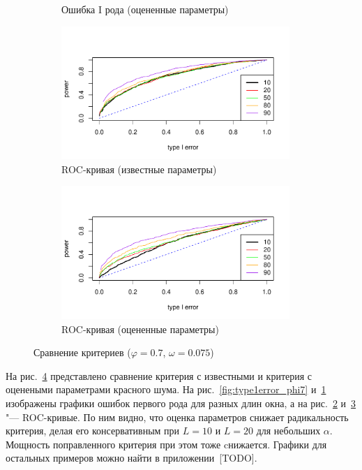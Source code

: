 \documentclass[specialist,
substylefile = spbu_report.rtx,
subf,href,colorlinks=true, 12pt]{disser}
\theoremstyle{definition}
\begin{document}
\begin{figure}[h!]
\begin{subfigure}[t]{0.5\textwidth}
		\caption{Ошибка I рода (оцененные параметры)}
		\label{fig:type1error_phi7est}
	\end{subfigure}
	\bigskip
	\begin{subfigure}[t]{0.5\textwidth}
		\centering
		\includegraphics[width=0.95\textwidth]{img/roc_phi7_omega0075.pdf}
		\caption{ROC-кривая (известные параметры)}
		\label{fig:roc_phi7_omega0075}
	\end{subfigure}\hspace{\fill}
	\begin{subfigure}[t]{0.5\textwidth}
		\centering
		\includegraphics[width=0.95\textwidth]{img/roc_phi7est_omega0075.pdf}
		\caption{ROC-кривая (оцененные параметры)}
		\label{fig:roc_phi7est_omega0075}
	\end{subfigure}
	\caption{Сравнение критериев ($\varphi=0.7$, $\omega=0.075$)}
	\label{fig:est_comp}
\end{figure}

На рис.~\ref{fig:est_comp} представлено сравнение критерия с известными и критерия с оценеными параметрами красного шума. На рис.~\ref{fig:type1error_phi7} и~\ref{fig:type1error_phi7est} изображены графики ошибок первого рода для разных длин окна, а на рис.~\ref{fig:roc_phi7_omega0075} и~\ref{fig:roc_phi7est_omega0075} "--- ROC-кривые. По ним видно, что оценка параметров снижает радикальность критерия, делая его консервативным при $L=10$ и $L=20$ для небольших $\alpha$. Мощность поправленного критерия при этом тоже cнижается. Графики для остальных примеров можно найти в приложении~[TODO].
\end{document}
